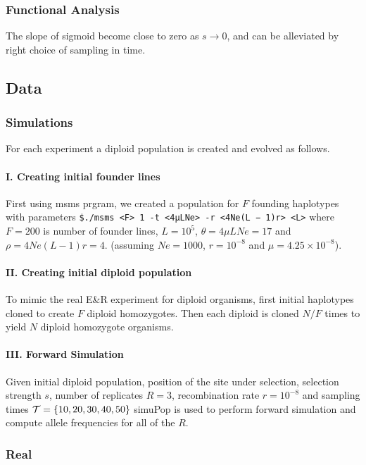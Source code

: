 \subsubsection{Functional Analysis}
The slope of sigmoid become close to zero as $s \rightarrow 0$, and can be alleviated by right choice of sampling in time.


\subsection{Data}
\subsubsection{Simulations}
For each experiment a diploid population is created and evolved as follows. 
\paragraph{I. Creating initial founder lines}
First using msms prgram, we created a population for $F$ founding haplotypes with parameters \texttt{\$./msms <F> 1 -t <4μLNe> -r <4Ne(L − 1)r> <L>} where $F=200$ is number of founder lines, 
$L=10^5$, $\theta=4\mu LNe=17$ and $\rho=4Ne(L-1)r=4$.  (assuming $Ne=1000$, $r=10^{-8}$ and $\mu=4.25\times 10^{-8}$).  
\paragraph{II. Creating initial diploid population} 
To mimic the real E\&R experiment for diploid organisms, first initial haplotypes cloned to create $F$ diploid homozygotes. Then each diploid is cloned $N/F$ times to yield $N$ diploid homozygote organisms.
\paragraph{III. Forward Simulation}
Given initial diploid population, position of the site under selection, selection strength $s$, number of replicates $R=3$, recombination rate $r=10^{-8}$ and sampling times ${\cal T}=\{10,20,30,40,50\}$ simuPop is used to perform forward simulation and compute allele frequencies for all of the $R$.

\subsubsection{Real}

